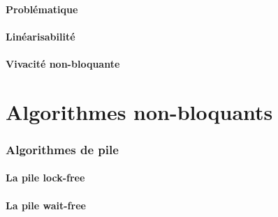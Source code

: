 \documentclass[9pt]{beamer}
\begin{document}
\subsection{Problématique}


\subsection{Linéarisabilité}







\subsection{Vivacité non-bloquante}









\part{Algorithmes non-bloquants}


\section{Algorithmes de pile}

\subsection{La pile lock-free}




\subsection{La pile wait-free}




\end{document}

